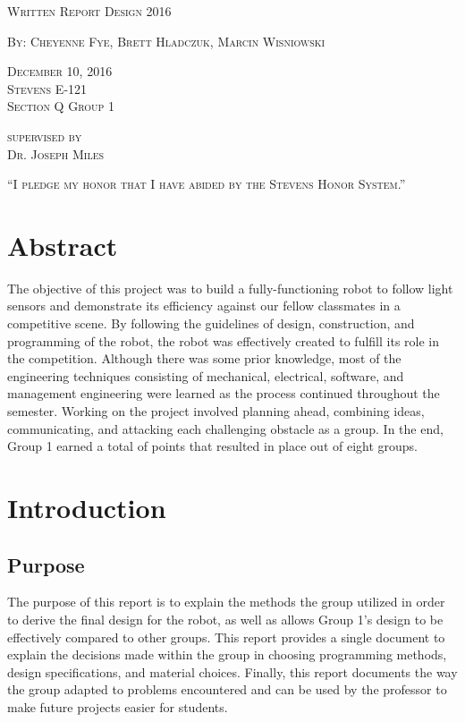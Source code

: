 \documentclass{article}
\begin{document}
\begin{titlepage}
    \centering
	{\scshape\LARGE Written Report Design 2016 \par}
	\vspace{1cm}
	{\scshape By: Cheyenne Fye, Brett Hladczuk, Marcin Wisniowski \par}
	\vfill
	{\scshape December 10, 2016\\Stevens E-121\\Section Q Group 1 \par}
	\vspace{.5cm}
	{\scshape supervised by \\Dr. Joseph Miles \par}
    \vfill
	{\scshape “I pledge my honor that I have abided by the Stevens Honor System.”\par}
\end{titlepage}

\section{Abstract}
The objective of this project was to build a fully-functioning robot to follow light sensors and demonstrate its efficiency against our fellow classmates in a competitive scene. By following the guidelines of design, construction, and programming of the robot, the robot was effectively created to fulfill its role in the competition. Although there was some prior knowledge, most of the engineering techniques consisting of mechanical, electrical, software, and management engineering were learned as the process continued throughout the semester. Working on the project involved planning ahead, combining ideas, communicating, and attacking each challenging obstacle as a group. In the end, Group 1 earned a total of  points that resulted in place out of eight groups.
\newpage

\tableofcontents
\newpage

\section{Introduction}
\subsection{Purpose}
	The purpose of this report is to explain the methods the group utilized in order to derive the final design for the robot, as well as allows Group 1’s design to be effectively compared to other groups. This report provides a single document to explain the decisions made within the group in choosing programming methods, design specifications, and material choices. Finally, this report documents the way the group adapted to problems encountered and can be used by the professor to make future projects easier for students.
\end{document}
